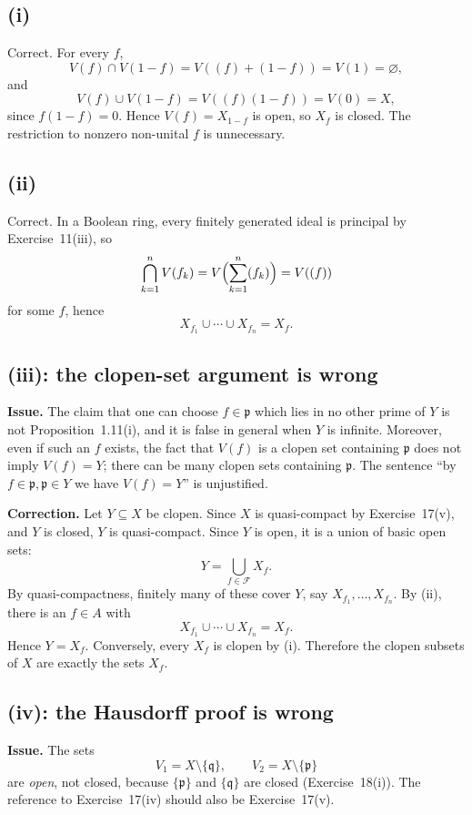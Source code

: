 \documentclass[11pt]{article}
\newcommand{\fp}{\mathfrak p}
\newcommand{\fq}{\mathfrak q}
\begin{document}
\subsection*{(i)}
Correct.  For every \(f\),
\[
V(f)\cap V(1-f)=V((f)+(1-f))=V(1)=\varnothing,
\]
and
\[
V(f)\cup V(1-f)=V((f)(1-f))=V(0)=X,
\]
since \(f(1-f)=0\).  Hence \(V(f)=X_{1-f}\) is open, so \(X_f\) is closed.
The restriction to nonzero non-unital \(f\) is unnecessary.

\subsection*{(ii)}
Correct.  In a Boolean ring, every finitely generated ideal is principal by
Exercise~11(iii), so
\[
\bigcap_{k=1}^nV(f_k)
=V\Bigl(\sum_{k=1}^n(f_k)\Bigr)
=V((f))
\]
for some \(f\), hence
\[
X_{f_1}\cup\cdots\cup X_{f_n}=X_f.
\]

\subsection*{(iii): the clopen-set argument is wrong}

\textbf{Issue.}  The claim that one can choose \(f\in\fp\) which lies in no
other prime of \(Y\) is not Proposition~1.11(i), and it is false in general
when \(Y\) is infinite.  Moreover, even if such an \(f\) exists, the fact that
\(V(f)\) is a clopen set containing \(\fp\) does not imply \(V(f)=Y\); there
can be many clopen sets containing \(\fp\).  The sentence ``by
\(f\in\fp,\fp\in Y\) we have \(V(f)=Y\)'' is unjustified.

\textbf{Correction.}  Let \(Y\subseteq X\) be clopen.  Since \(X\) is
quasi-compact by Exercise~17(v), and \(Y\) is closed, \(Y\) is
quasi-compact.  Since \(Y\) is open, it is a union of basic open sets:
\[
Y=\bigcup_{f\in\mathcal F}X_f.
\]
By quasi-compactness, finitely many of these cover \(Y\), say
\(X_{f_1},\ldots,X_{f_n}\).  By (ii), there is an \(f\in A\) with
\[
X_{f_1}\cup\cdots\cup X_{f_n}=X_f.
\]
Hence \(Y=X_f\).  Conversely, every \(X_f\) is clopen by (i).  Therefore the
clopen subsets of \(X\) are exactly the sets \(X_f\).

\subsection*{(iv): the Hausdorff proof is wrong}

\textbf{Issue.}  The sets
\[
V_1=X\setminus\{\fq\},\qquad V_2=X\setminus\{\fp\}
\]
are \emph{open}, not closed, because \(\{\fp\}\) and \(\{\fq\}\) are closed
(Exercise~18(i)).  The reference to Exercise~17(iv) should also be
Exercise~17(v).
\end{document}
